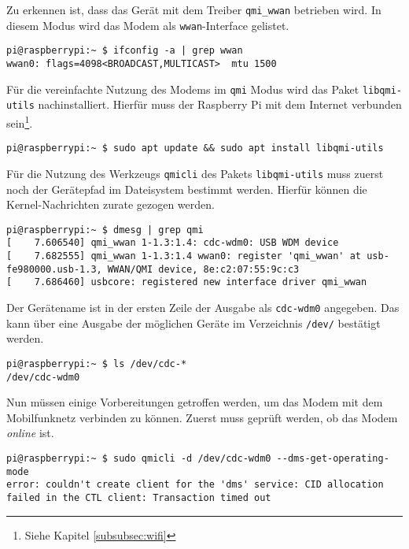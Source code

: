\noindent Zu erkennen ist, dass das Gerät mit dem Treiber \texttt{qmi\_wwan} betrieben wird.
In diesem Modus wird das Modem als \texttt{wwan}-Interface gelistet.

\begin{lstlisting}
pi@raspberrypi:~ $ ifconfig -a | grep wwan
wwan0: flags=4098<BROADCAST,MULTICAST>  mtu 1500
\end{lstlisting}

\noindent Für die vereinfachte Nutzung des Modems im \texttt{qmi} Modus wird das Paket \texttt{libqmi-utils} nachinstalliert.
Hierfür muss der Raspberry Pi mit dem Internet verbunden sein\footnote{Siehe Kapitel \ref{subsubsec:wifi}}.

\begin{lstlisting}
pi@raspberrypi:~ $ sudo apt update && sudo apt install libqmi-utils
\end{lstlisting}

\noindent Für die Nutzung des Werkzeugs \texttt{qmicli} des Pakets \texttt{libqmi-utils} muss zuerst noch der Gerätepfad im
Dateisystem bestimmt werden.
Hierfür können die Kernel-Nachrichten zurate gezogen werden.

\begin{lstlisting}
pi@raspberrypi:~ $ dmesg | grep qmi
[    7.606540] qmi_wwan 1-1.3:1.4: cdc-wdm0: USB WDM device
[    7.682555] qmi_wwan 1-1.3:1.4 wwan0: register 'qmi_wwan' at usb-fe980000.usb-1.3, WWAN/QMI device, 8e:c2:07:55:9c:c3
[    7.686460] usbcore: registered new interface driver qmi_wwan
\end{lstlisting}

\noindent Der Gerätename ist in der ersten Zeile der Ausgabe als \texttt{cdc-wdm0} angegeben.
Das kann über eine Ausgabe der möglichen Geräte im Verzeichnis \texttt{/dev/} bestätigt werden.

\begin{lstlisting}
pi@raspberrypi:~ $ ls /dev/cdc-*
/dev/cdc-wdm0
\end{lstlisting}



Nun müssen einige Vorbereitungen getroffen werden, um das Modem mit dem Mobilfunknetz verbinden zu können.
Zuerst muss geprüft werden, ob das Modem \emph{online} ist.

\begin{lstlisting}
pi@raspberrypi:~ $ sudo qmicli -d /dev/cdc-wdm0 --dms-get-operating-mode
error: couldn't create client for the 'dms' service: CID allocation failed in the CTL client: Transaction timed out
\end{lstlisting}

